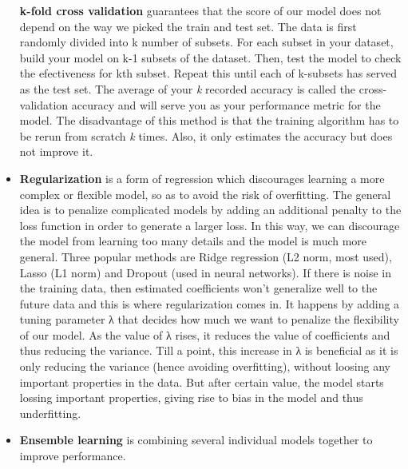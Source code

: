 \documentclass[
  letterpaper,
  DIV=11,
  numbers=noendperiod]{scrreprt}
\begin{document}
\begin{itemize}
  \textbf{k-fold cross validation} guarantees that the score of our
  model does not depend on the way we picked the train and test set. The
  data is first randomly divided into k number of subsets. For each
  subset in your dataset, build your model on k-1 subsets of the
  dataset. Then, test the model to check the efectiveness for kth
  subset. Repeat this until each of k-subsets has served as the test
  set. The average of your \emph{k} recorded accuracy is called the
  cross-validation accuracy and will serve you as your performance
  metric for the model. The disadvantage of this method is that the
  training algorithm has to be rerun from scratch \emph{k} times. Also,
  it only estimates the accuracy but does not improve it.
\item
  \textbf{Regularization} is a form of regression which discourages
  learning a more complex or flexible model, so as to avoid the risk of
  overfitting. The general idea is to penalize complicated models by
  adding an additional penalty to the loss function in order to generate
  a larger loss. In this way, we can discourage the model from learning
  too many details and the model is much more general. Three popular
  methods are Ridge regression (L2 norm, most used), Lasso (L1 norm) and
  Dropout (used in neural networks). If there is noise in the training
  data, then estimated coefficients won't generalize well to the future
  data and this is where regularization comes in. It happens by adding a
  tuning parameter λ that decides how much we want to penalize the
  flexibility of our model. As the value of λ rises, it reduces the
  value of coefficients and thus reducing the variance. Till a point,
  this increase in λ is beneficial as it is only reducing the variance
  (hence avoiding overfitting), without loosing any important properties
  in the data. But after certain value, the model starts lossing
  important properties, giving rise to bias in the model and thus
  underfitting.
\item
  \textbf{Ensemble learning} is combining several individual models
  together to improve performance.


\end{itemize}
\end{document}
